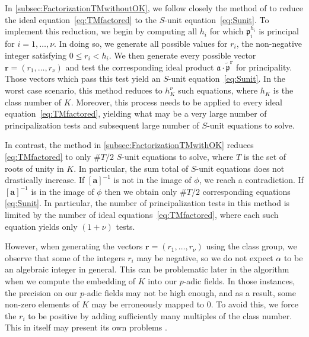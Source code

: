In \autoref{subsec:FactorizationTMwithoutOK}, we follow closely the method of  to reduce the ideal equation~\eqref{eq:TMfactored} to the $S$-unit equation~\eqref{eq:Sunit}. To implement this reduction, we begin by computing all $h_i$ for which $\mathfrak{p}_i^{h_i}$ is principal for $i = 1, \dots, \nu$. In doing so, we generate all possible values for $r_i$, the non-negative integer satisfying $0 \leq r_i < h_i$. We then generate every possible vector $\mathbf{r} = (r_1, \dots, r_{\nu})$ and test the corresponding ideal product $\mathfrak{a} \cdot \tilde{\mathfrak{p}}^{\mathbf{r}}$ for principality. Those vectors which pass this test yield an $S$-unit equation~\eqref{eq:Sunit}. In the worst case scenario, this method reduces to $h_K^{\nu}$ such equations, where $h_K$ is the class number of $K$. Moreover, this process needs to be applied to every ideal equation~\eqref{eq:TMfactored}, yielding what may be a very large number of principalization tests and subsequent large number of $S$-unit equations to solve. 

In contrast, the method in \autoref{subsec:FactorizationTMwithOK} reduces \eqref{eq:TMfactored} to only $\#T/2$ $S$-unit equations to solve, where $T$ is the set of roots of unity in $K$. In particular, the sum total of $S$-unit equations does not drastically increase. If $[\mathbf{a}]^{-1}$ is not in the image of $\phi$, we reach a contradiction. If $[\mathbf{a}]^{-1}$ is in the image of $\phi$ then we obtain only $\#T/2$ corresponding equations \eqref{eq:Sunit}. In particular, the number of principalization tests in this method is limited by the number of ideal equations~\eqref{eq:TMfactored}, where each such equation yields only $(1+\nu)$ tests. 

However, when generating the vectors $\mathbf{r} = (r_1, \dots, r_{\nu})$ using the class group, we observe that some of the integers $r_i$ may be negative, so we do not expect $\alpha$ to be an algebraic integer in general. This can be problematic later in the algorithm when we compute the embedding of $K$ into our $p$-adic fields. In those instances, the precision on our $p$-adic fields may not be high enough, and as a result, some non-zero elements of $K$ may be erroneously mapped to $0$. To avoid this, we force the $r_i$ to be positive by adding sufficiently many multiples of the class number. This in itself may present its own problems .

